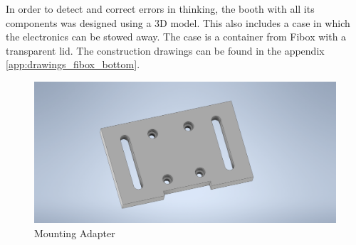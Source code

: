In order to detect and correct errors in thinking, the booth with all its components was designed using a 3D model.
This also includes a case in which the electronics can be stowed away.
The case is a container from Fibox with a transparent lid.
The construction drawings can be found in the appendix \ref{app:drawings_fibox_bottom}.

\begin{figure}[h]
	\centering
	\includegraphics[scale=0.2]{graphics/mounting_adapter.png}
	\caption{Mounting Adapter}
	\label{fig:mounting_adapter}
\end{figure}


